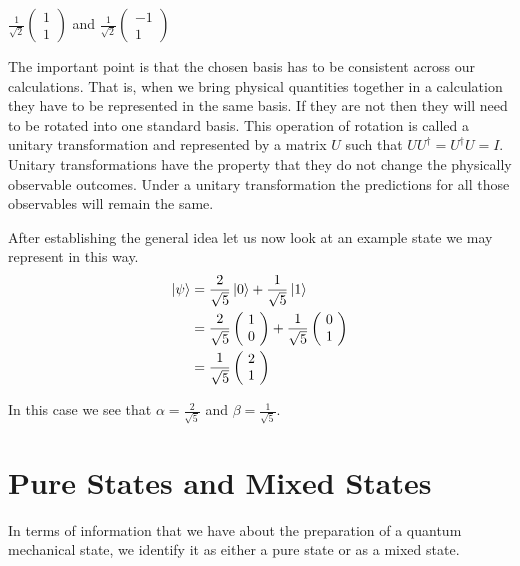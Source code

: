\begin{center}
$ \frac{1}{\sqrt{2}} \left(\! \begin{array}{c} 1 \\ 1 \end{array} \!\right) $ and $ \frac{1}{\sqrt{2}} \left(\! \begin{array}{c} -1 \\ 1 \end{array} \!\right) $
\end{center}
The important point is that the chosen basis has to be consistent across our calculations. That is, when we bring physical quantities together in a calculation they have to be represented in the same basis. If they are not then they will need to be rotated into one standard basis. This operation of rotation is called a unitary transformation and represented by a matrix $U$ such that $U U^\dagger = U^\dagger U = I$. Unitary transformations have the property that they do not change the physically observable outcomes. Under a unitary transformation the predictions for all those observables will remain the same.
\par After establishing the general idea let us now look at an example state we may represent in this way.
\begin{align*}
  \Ket{\psi} &= \frac{2}{\sqrt{5}} \Ket{0} + \frac{1}{\sqrt{5}} \Ket{1} \\
  &= \frac{2}{\sqrt{5}} \left(\! \begin{array}{c} 1 \\ 0 \end{array} \!\right) + \frac{1}{\sqrt{5}} \left(\! \begin{array}{c} 0 \\ 1 \end{array} \!\right) \\
  &= \frac{1}{\sqrt{5}} \left(\! \begin{array}{c} 2 \\ 1 \end{array} \!\right)
\end{align*}
\par In this case we see that $\alpha = \frac{2}{\sqrt{5}}$ and $\beta = \frac{1}{\sqrt{5}}$.
\section{Pure States and Mixed States}
In terms of information that we have about the preparation of a quantum mechanical state, we identify it as either a pure state or as a mixed state.
